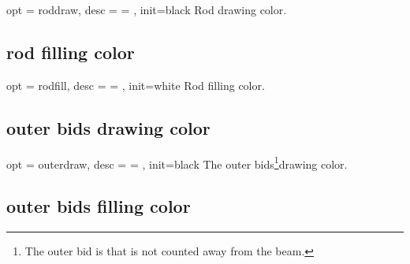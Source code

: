 \documentclass[full]{l3doc}
\begin{document}
\begin{documentation}
\begin{option}{ opt = roddraw, desc = {= }, init=black }
  Rod drawing color.
\end{option}

\begin{SideBySideExample}[frame=single,numbers=left,%
                xrightmargin=.37\linewidth,gobble=2]
  \centering
  \begin{suanpan}
  \end{suanpan}
\end{SideBySideExample}

\subsection{rod filling color}

\begin{option}{ opt = rodfill, desc = {= }, init=white }
  Rod filling color.
\end{option}

\begin{SideBySideExample}[frame=single,numbers=left,%
                xrightmargin=.37\linewidth,gobble=2]
  \centering
  \begin{suanpan}
  \end{suanpan}
\end{SideBySideExample}

\subsection{outer bids drawing color}

\begin{option}{ opt = outerdraw, desc = {= }, init=black }
  The outer bids\footnote{The outer bid is that is not counted away from the beam.}drawing color.
\end{option}

\begin{SideBySideExample}[frame=single,numbers=left,%
                xrightmargin=.37\linewidth,gobble=2]
  \centering
  \begin{suanpan}
  \end{suanpan}
\end{SideBySideExample}

\subsection{outer bids filling color}


\end{documentation}
\end{document}
